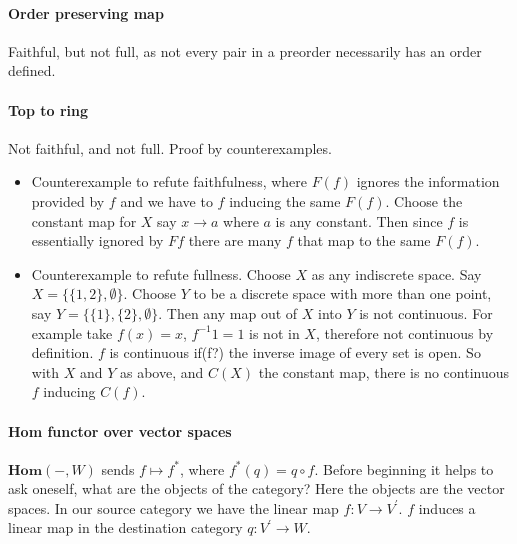 \documentclass{article}
\begin{document}
\paragraph{Order preserving map}

Faithful, but not full, as not every pair in a preorder necessarily has an order defined.

\paragraph{Top to ring}

Not faithful, and not full. Proof by counterexamples.

\begin{itemize}

\item Counterexample to refute faithfulness, where $F(f)$ ignores the information provided by $f$ and we have to $f$ inducing the same $F(f)$. Choose the constant map for $X$ say $x \rightarrow a$ where $a$ is any constant. Then since $f$ is essentially ignored by $Ff$ there are many $f$ that map to the same $F(f)$.

\item Counterexample to refute fullness. Choose $X$ as any indiscrete space. Say $X = \{ \{1,2\}, \emptyset \}$. Choose $Y$ to be a discrete space with more than one point, say $Y = \{ \{1\}, \{2\}, \emptyset \}$. Then any map out of $X$ into $Y$ is not continuous. For example take $f(x) = x$, $f^{-1}{1} = {1}$ is not in $X$, therefore not continuous by definition. $f$ is continuous if(f?)  the inverse image of every set is open. So with $X$ and $Y$ as above, and $C(X)$ the constant map, there is no continuous $f$ inducing $C(f)$.

\end{itemize}

\paragraph{Hom functor over vector spaces}

$\mathbf{Hom}(-,W)$ sends $f \mapsto f^*$, where $ f^*(q) = q \circ f$. Before beginning it helps to ask oneself, what are the objects of the category? Here the objects are the vector spaces. In our source category we have the linear map $f\colon V \rightarrow V^\prime$. $f$ induces a linear map in the destination category $q\colon V^\prime \rightarrow W$.
\end{document}
